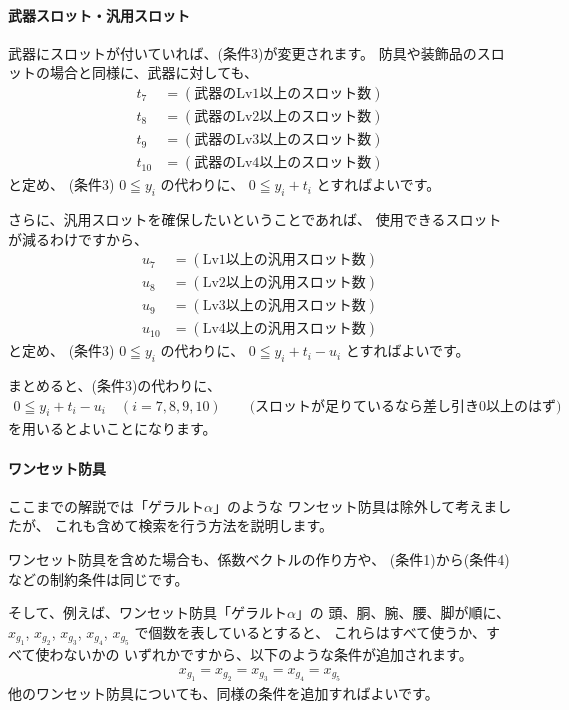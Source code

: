 \documentclass{jsarticle}
\begin{document}
\paragraph{武器スロット・汎用スロット}
武器にスロットが付いていれば、(条件3)が変更されます。
防具や装飾品のスロットの場合と同様に、武器に対しても、
\begin{align*}
t_7    &= (\text{武器のLv1以上のスロット数}) \\
t_8    &= (\text{武器のLv2以上のスロット数}) \\
t_9    &= (\text{武器のLv3以上のスロット数}) \\
t_{10} &= (\text{武器のLv4以上のスロット数})
\end{align*}
と定め、
(条件3) $0 \leqq y_i$ の代わりに、
$0 \leqq y_i + t_i$ とすればよいです。

さらに、汎用スロットを確保したいということであれば、
使用できるスロットが減るわけですから、
\begin{align*}
u_7    &= (\text{Lv1以上の汎用スロット数}) \\
u_8    &= (\text{Lv2以上の汎用スロット数}) \\
u_9    &= (\text{Lv3以上の汎用スロット数}) \\
u_{10} &= (\text{Lv4以上の汎用スロット数})
\end{align*}
と定め、
(条件3) $0 \leqq y_i$ の代わりに、
$0 \leqq y_i + t_i - u_i$ とすればよいです。

まとめると、(条件3)の代わりに、
\begin{align*}
0 \leqq y_i + t_i - u_i
\quad (i = 7,8,9,10)  
\qquad \text{(スロットが足りているなら差し引き0以上のはず)}
\tag{条件3$'$}
\end{align*}
を用いるとよいことになります。

\paragraph{ワンセット防具}
ここまでの解説では「ゲラルト$\alpha$」のような
ワンセット防具は除外して考えましたが、
これも含めて検索を行う方法を説明します。

ワンセット防具を含めた場合も、係数ベクトルの作り方や、
(条件1)から(条件4)などの制約条件は同じです。

そして、例えば、ワンセット防具「ゲラルト$\alpha$」の
頭、胴、腕、腰、脚が順に、
$x_{g_1}$, $x_{g_2}$, $x_{g_3}$, $x_{g_4}$, $x_{g_5}$
で個数を表しているとすると、
これらはすべて使うか、すべて使わないかの
いずれかですから、以下のような条件が追加されます。
%
\begin{align*}
x_{g_1} = x_{g_2} = x_{g_3} = x_{g_4} = x_{g_5}
\tag{ワンセット防具の条件}
\end{align*}
%
他のワンセット防具についても、同様の条件を追加すればよいです。
\end{document}
